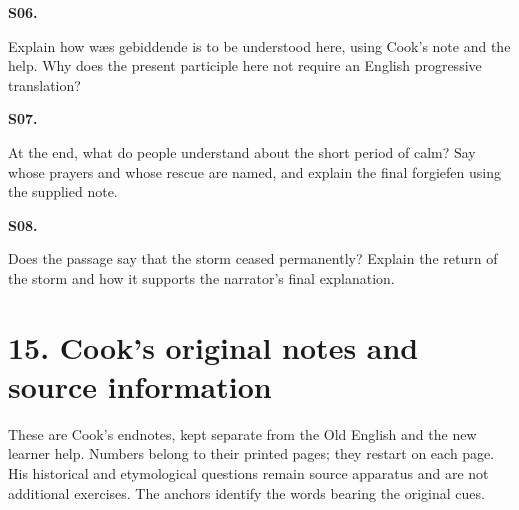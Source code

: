 \par\begin{minipage}{\linewidth}\raggedright
\textbf{S06.}

Explain how wæs gebiddende is to be understood here, using Cook’s note and the help. Why does the present participle here not require an English progressive translation?

\end{minipage}\par\addvspace{4pt}

\par\begin{minipage}{\linewidth}\raggedright
\textbf{S07.}

At the end, what do people understand about the short period of calm? Say whose prayers and whose rescue are named, and explain the final forgiefen using the supplied note.

\end{minipage}\par\addvspace{4pt}

\par\begin{minipage}{\linewidth}\raggedright
\textbf{S08.}

Does the passage say that the storm ceased permanently? Explain the return of the storm and how it supports the narrator’s final explanation.

\end{minipage}\par\addvspace{4pt}

\section*{15. Cook’s original notes and source information}

\begingroup\fontsize{10}{12.8}\selectfont
\setlength{\parskip}{1.5pt}
These are Cook’s endnotes, kept separate from the Old English and the new learner help. Numbers belong to their printed pages; they restart on each page. His historical and etymological questions remain source apparatus and are not additional exercises. The anchors identify the words bearing the original cues.

